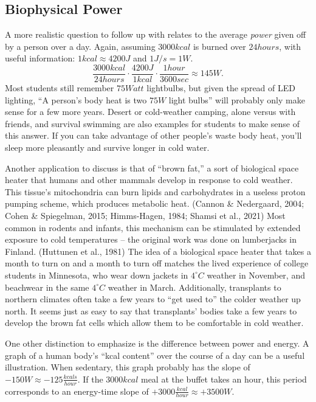 \documentclass[man]{apa7}
\newcommand{\be}{\begin{equation}}
\newcommand{\ee}{\end{equation}}
\newcommand{\degC}{^{\circ}C}
\begin{document}
\subsection{Biophysical Power}
A more realistic question to follow up with relates to the average \textit{power} given off by a person over a day.  
Again, assuming $3000kcal$ is burned over $24 hours$, with useful information: $1 kcal \approx 4200J$ and $1 J/s=1W$.
\be
\frac{3000kcal}{24hours}\cdot\frac{4200J}{1kcal}\cdot\frac{1hour}{3600sec}\approx145W .
\ee
Most students still remember $75Watt$ lightbulbs, but given the spread of LED lighting, ``A person's body heat is two $75W$ light bulbs'' will probably only make sense for a few more years.  Desert or cold-weather camping, alone versus with friends, and survival swimming are also examples for students to make sense of this answer.  If you can take advantage of other people's waste body heat, you'll sleep more pleasantly and survive longer in cold water.  

Another application to discuss is that of ``brown fat,'' a sort of biological space heater that humans and other mammals develop in response to cold weather.  This tissue's mitochondria can burn lipids and carbohydrates in a useless proton pumping scheme, which produces metabolic heat. (Cannon \& Nedergaard, 2004;
Cohen \& Spiegelman, 2015; 
Himms-Hagen, 1984;
Shamsi et al., 2021)
Most common in rodents and infants, this mechanism can be stimulated by extended exposure to cold temperatures -- the original work was done on lumberjacks in Finland.
(Huttunen et al., 1981)
The idea of a biological space heater that takes a month to turn on and a month to turn off matches the lived experience of college students in Minnesota, who wear down jackets in $4\degC$ weather in November, and beachwear in the same $4\degC$ weather in March.  Additionally, transplants to northern climates often take a few years to ``get used to'' the colder weather up north. It seems just as easy to say that transplants' bodies take a few years to develop the brown fat cells which allow them to be comfortable in cold weather.

One other distinction to emphasize is the difference between power and energy.  A graph of a human body's ``kcal content'' over the course of a day can be a useful illustration.  When sedentary, this graph probably has the slope of $-150W\approx -125 \frac{kcals}{hour}$.  If the $3000kcal$ meal at the buffet takes an hour, this period corresponds to an energy-time slope of 
$+3000\frac{kcal}{hour}\approx +3500W$.  
\end{document}
